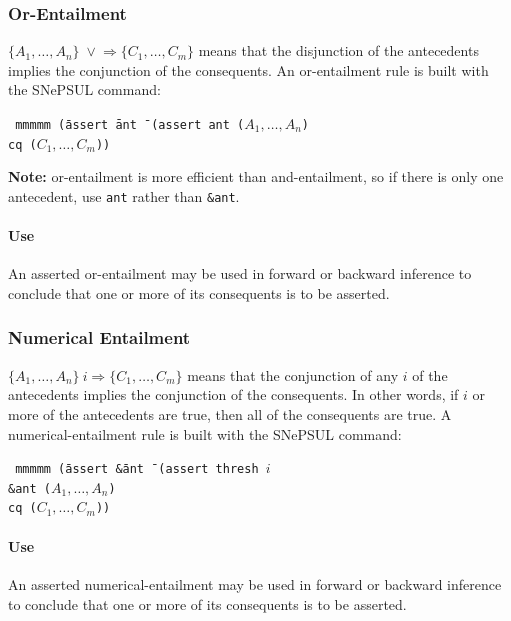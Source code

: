 \documentclass{book}
\begin{document}
\subsubsection{Or-Entailment}

$\{A_1, \ldots, A_n\} \; \vee\!\!\!\Rightarrow \{C_1, \ldots, C_m\}$
means that the disjunction of the antecedents implies the conjunction of the
consequents.  An or-entailment rule is built with the SNePSUL command:
\begin{tabbing} \tt
mmmmm \=(assert \=ant \= \kill
      \>(assert \>ant \>($A_1, \ldots, A_n$) \\
      \>        \>cq    \>($C_1, \ldots, C_m$))
\end{tabbing}

{\bf Note:} or-entailment is more efficient than and-entailment, so if there is only one antecedent,
use {\tt ant} rather than {\tt \&ant}.

\paragraph{Use}

An asserted or-entailment may be used in forward or backward inference to conclude that one or more
of its consequents is to be asserted.

\subsubsection{Numerical Entailment}

$\{A_1, \ldots, A_n\} \: i \!\!\Rightarrow \{C_1, \ldots, C_m\}$ means that the conjunction of any
$i$ of the antecedents implies the conjunction of the consequents.  In other words, if $i$ or more
of the antecedents are true, then all of the consequents are true.  A numerical-entailment rule is
built with the SNePSUL command:
\begin{tabbing} \tt
mmmmm \=(assert \=\&ant \= \kill
      \>(assert \>thresh $i$ \\
      \>        \>\&ant \>($A_1, \ldots, A_n$) \\
      \>        \>cq    \>($C_1, \ldots, C_m$))
\end{tabbing}

\paragraph{Use}

An asserted numerical-entailment may be used in forward or backward inference to conclude that one or more
of its consequents is to be asserted.
\end{document}
